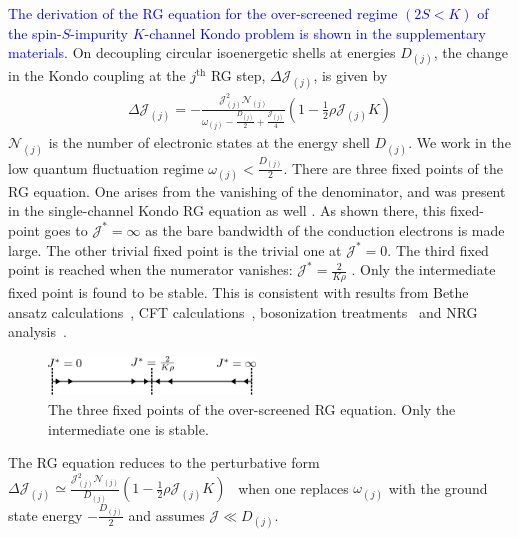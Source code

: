 \documentclass[reprint,prb,superscriptaddress]{revtex4-1}
\begin{document}
\textcolor{blue}{The derivation of the RG equation for the over-screened regime \((2S < K)\) of the spin-\(S\)-impurity \(K\)-channel Kondo problem is shown in the supplementary materials.}
On decoupling circular isoenergetic shells at energies \(D_{(j)}\), the change in the Kondo coupling at the \(j^\text{th}\) RG step, \(\Delta {\mathcal{J}}_{(j)}\), is given by
\begin{equation}\begin{aligned}
	\Delta {\mathcal{J}}_{(j)} = -\frac{{\mathcal{J}}_{(j)}^2 \mathcal{N}_{(j)}}{\omega_{(j)} - \frac{D_{(j)}}{2} + \frac{{\mathcal{J}}_{(j)}}{4}}\left( 1 - \frac{1}{2}\rho {\mathcal{J}}_{(j)} K \right) 
\end{aligned}\end{equation}
\(\mathcal{N}_{(j)}\) is the number of electronic states at the energy shell \(D_{(j)}\). We work in the low quantum fluctuation regime \(\omega_{(j)} < \frac{D_{(j)}}{2}\). There are three fixed points of the RG equation. One arises from the vanishing of the denominator, and was present in the single-channel Kondo RG equation as well \cite{kondo_urg}. As shown there, this fixed-point goes to \({\mathcal{J}}^* = \infty\) as the bare bandwidth of the conduction electrons is made large. The other trivial fixed point is the trivial one at \({\mathcal{J}}^* = 0\). The third fixed point is reached when the numerator vanishes: \({\mathcal{J}}^* = \frac{2}{K \rho}\) \cite{Gan_mchannel_1994,Kogan_2018,Kuramoto1998,Noz_blandin_1980}. Only the intermediate fixed point is found to be stable. This is consistent with results from Bethe ansatz calculations~\cite{Tsvelick_Weigmann_mchannel_1984,andrei_destri_1984,zarand_costi_2002,andrei_jerez_1995,Tsvelick_1985,Tsvelick1984}, CFT calculations~\cite{affleck_1991_overscreen,affleck1993exact,affleck_ludwig_1991}, bosonization treatments~\cite{emery_kivelson,vondelft_prl_1998} and NRG analysis~\cite{pang_cox_1991,mitchell_bulla_2014}.
\begin{figure}[htpb]
	\centering
	\includegraphics[width=0.49\textwidth]{plt/rg_flow.pdf}
	\caption{The three fixed points of the over-screened RG equation. Only the intermediate one is stable.}
	\label{rg_flow}
\end{figure}

The RG equation reduces to the perturbative form \(\Delta {\mathcal{J}}_{(j)} \simeq \frac{{\mathcal{J}}_{(j)}^2 \mathcal{N}_{(j)}}{D_{(j)}}\left( 1 - \frac{1}{2}\rho {\mathcal{J}}_{(j)} K \right)\)~\cite{Kogan_2018,Kuramoto1998,Noz_blandin_1980,tripathi2018landau} when one replaces \(\omega_{(j)}\) with the ground state energy \(-\frac{D_{(j)}}{2}\) and assumes \({\mathcal{J}} \ll D_{(j)}\).
\end{document}
